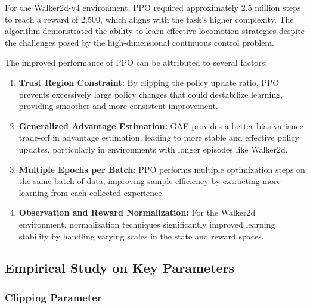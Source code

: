 \documentclass[a4paper,twocolumn]{article}
\begin{document}
For the Walker2d-v4 environment, PPO required approximately 2.5 million steps to reach a reward of 2,500, which aligns with the task's higher complexity. The algorithm demonstrated the ability to learn effective locomotion strategies despite the challenges posed by the high-dimensional continuous control problem.

The improved performance of PPO can be attributed to several factors:

\begin{enumerate}
    \item \textbf{Trust Region Constraint:} By clipping the policy update ratio, PPO prevents excessively large policy changes that could destabilize learning, providing smoother and more consistent improvement.
    
    \item \textbf{Generalized Advantage Estimation:} GAE provides a better bias-variance trade-off in advantage estimation, leading to more stable and effective policy updates, particularly in environments with longer episodes like Walker2d.
    
    \item \textbf{Multiple Epochs per Batch:} PPO performs multiple optimization steps on the same batch of data, improving sample efficiency by extracting more learning from each collected experience.
    
    \item \textbf{Observation and Reward Normalization:} For the Walker2d environment, normalization techniques significantly improved learning stability by handling varying scales in the state and reward spaces.
\end{enumerate}

\subsection{Empirical Study on Key Parameters}

\subsubsection{Clipping Parameter}

\end{document}
